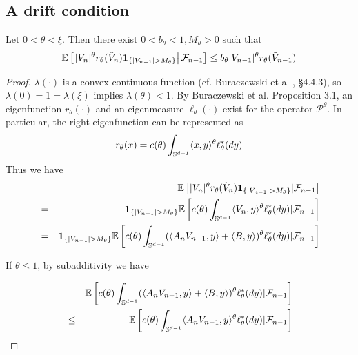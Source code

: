 \subsection{A drift condition}
\begin{lemma}
  \label{lemma:1}
  Let $0 < \theta < \xi$. Then there exist
  $0 < b_{\theta} < 1, M_{\theta} > 0$
  such that
  \begin{equation}
    \label{eq:drift}
    \mathbb{E} \left[\left.
      |V_n|^\theta r_\theta(\tilde V_n)
      \mathbf{1}_{\{|V_{n-1}| > M_{\theta}\}} \right|
      \mathcal F_{n-1} \right]
    \leq
    b_{\theta} |V_{n-1}|^\theta
    r_{\theta}(\tilde V_{n-1})
  \end{equation}
\end{lemma}
\begin{proof}
  $\lambda(\cdot)$ is a convex continuous function (cf. Buraczewski et
  al \cite{buraczewski:damek:mikosch:2016}, \S 4.4.3), so
  $\lambda(0) = 1 = \lambda(\xi)$ implies $\lambda(\theta) < 1$.
  By Buraczewski et al.\cite{buraczewski:damek:guivarch:mentemeier:2014} 
  Proposition 3.1, an eigenfunction $r_\theta(\cdot)$ and an
  eigenmeasure $\ell_\theta(\cdot)$ exist for the operator
  $\mathscr P^\theta$. 
  In particular, the right eigenfunction can be represented as
  \[
  r_{\theta}(x) = c(\theta) \int_{\mathbb S^{d-1}} \langle x, y\rangle^\theta
  \ell^*_{\theta}(dy)
  \]
  Thus we have
  \begin{eqnarray}
    && \mathbb{E} \left[ |V_n|^\theta r_{\theta}(\tilde V_n)
      \mathbf{1}_{\{|V_{n-1}| > M_{\theta}\}} | \mathcal F_{n-1} \right]
    \label{eq:drift_proof_1} \\
    &=&
    \mathbf{1}_{\{|V_{n-1}| > M_{\theta}\}}
    \mathbb{E}
    \left[
      c(\theta)\int_{\mathbb S^{d-1}} \langle V_n, y\rangle^\theta \ell^*_{\theta}(dy)|
      \mathcal F_{n-1} \right]
    \nonumber \\
    &=&
    \mathbf{1}_{\{|V_{n-1}| > M_{\theta}\}}
    \mathbb{E}\left[c(\theta)\int_{\mathbb S^{d-1}} (\langle A_n V_{n-1}, y\rangle + \langle B,
        y\rangle)^\theta \ell^*_{\theta}(dy) | \mathcal F_{n-1} \right]
    \nonumber
  \end{eqnarray}
  \begin{case}
    If $\theta \leq 1$, by subadditivity we have
  \end{case}
  \begin{eqnarray*}
    &&\E\left[c(\theta)\int_{\sphere^{d-1}} (\inn{A_n V_{n-1}, y} + \inn{B,
        y})^\theta \ell^*_{\theta}(dy) | \mathcal F_{n-1} \right]\\
    &\leq& \E\left[c(\theta)\int_{\sphere^{d-1}} \inn{A_n V_{n-1}, y}^\theta
      \ell^*_{\theta}(dy) | \mathcal F_{n-1} \right]

\end{eqnarray*}
\end{proof}
